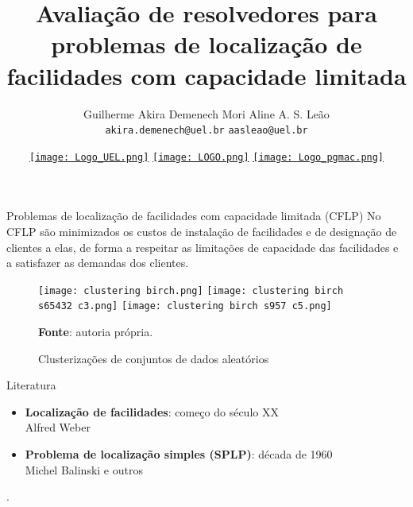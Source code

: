 \documentclass[aspectratio=169]{beamer}
\date{\href{https://www.uel.br/}{\texttt{[image: Logo\_UEL.png]}} \quad
	\href{https://www.uel.br/eventos/verao/2023/painel-alunos.html}{\texttt{[image: LOGO.png]}} \quad
	\href{https://www.uel.br/pos/pgmac}{\texttt{[image: Logo\_pgmac.png]}}}
\title{Avaliação de resolvedores para problemas de localização de facilidades com capacidade limitada}
\author{Guilherme Akira Demenech Mori
	\qquad \qquad Aline A. S. Leão
	\\	\texttt{akira.demenech@uel.br}
	\qquad \qquad \qquad 
	\texttt{aasleao@uel.br}}
\institute{\href{https://picme.obmep.org.br/}{\texttt{[image: Logo\_picme.png]}}}
\begin{document}
	\begin{frame} %
		\maketitle
	\end{frame}

	
	\begin{frame}{Problemas de localização de facilidades com capacidade limitada (CFLP)}
		No CFLP são minimizados os custos de instalação de facilidades e de designação de clientes a elas, de forma a respeitar as limitações de capacidade das facilidades e a satisfazer as demandas dos clientes. 

		\begin{figure}[H]
			\begin{center}
				\caption{Clusterizações de conjuntos de dados aleatórios}
				
				\texttt{[image: clustering birch.png]}
				\hfill 
				\texttt{[image: clustering birch s65432 c3.png]}
				\hfill 
				\texttt{[image: clustering birch s957 c5.png]}
				\label{ilustr:birch}
				
				\textbf{Fonte}: autoria própria.
			\end{center}
		\end{figure}
			
			
		
	\end{frame}	

	\begin{frame}{Literatura}
		
		\begin{itemize}
			\item \textbf{Localização de facilidades}: 
				começo do século XX				
				\\ Alfred Weber 
				
			\item \textbf{Problema de localização simples (SPLP)}: 
				década de 1960	
				\\ Michel Balinski e outros 
		\end{itemize}	
		\cite{Labbe,Krarup}.	 


	\end{frame}	
\end{document}

